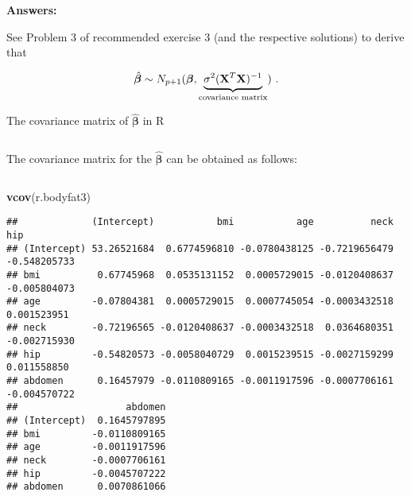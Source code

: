 \documentclass[10pt,ignorenonframetext,]{beamer}
\newenvironment{Shaded}{\begin{snugshade}}{\end{snugshade}}
\newcommand{\KeywordTok}[1]{\textcolor[rgb]{0.13,0.29,0.53}{\textbf{#1}}}
\newcommand{\NormalTok}[1]{#1}
\begin{document}
\begin{frame}

\textbf{Answers:}

See Problem 3 of recommended exercise 3 (and the respective solutions)
to derive that

\[\hat{\boldsymbol\beta}\sim N_{p+1}(\boldsymbol{\beta},\underbrace{\sigma^2({\bf X}^T{\bf X})^{-1}}_{\text{covariance matrix}}) \ . \]

\end{frame}

\begin{frame}[fragile]

\begin{block}{The covariance matrix of \(\boldsymbol{\hat\beta}\) in R}

\(~\)

The covariance matrix for the \(\boldsymbol{\hat\beta}\) can be obtained
as follows:

\(~\)

\scriptsize

\begin{Shaded}
\begin{Highlighting}[]
\KeywordTok{vcov}\NormalTok{(r.bodyfat3)}
\end{Highlighting}
\end{Shaded}

\begin{verbatim}
##             (Intercept)           bmi           age          neck          hip
## (Intercept) 53.26521684  0.6774596810 -0.0780438125 -0.7219656479 -0.548205733
## bmi          0.67745968  0.0535131152  0.0005729015 -0.0120408637 -0.005804073
## age         -0.07804381  0.0005729015  0.0007745054 -0.0003432518  0.001523951
## neck        -0.72196565 -0.0120408637 -0.0003432518  0.0364680351 -0.002715930
## hip         -0.54820573 -0.0058040729  0.0015239515 -0.0027159299  0.011558850
## abdomen      0.16457979 -0.0110809165 -0.0011917596 -0.0007706161 -0.004570722
##                   abdomen
## (Intercept)  0.1645797895
## bmi         -0.0110809165
## age         -0.0011917596
## neck        -0.0007706161
## hip         -0.0045707222
## abdomen      0.0070861066
\end{verbatim}

\end{block}

\end{frame}
\end{document}
